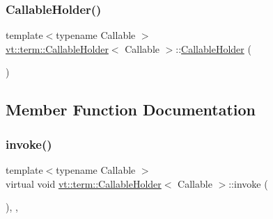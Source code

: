 \mbox{\label{structvt_1_1term_1_1_callable_holder_a02091f8787e03f8e29a9e78a975b86d4}} 
\subsubsection{\texorpdfstring{Callable\+Holder()}{CallableHolder()}\hspace{0.1cm}{\footnotesize\ttfamily [3/3]}}
{\footnotesize\ttfamily template$<$typename Callable $>$ \\
\hyperlink{structvt_1_1term_1_1_callable_holder}{vt\+::term\+::\+Callable\+Holder}$<$ Callable $>$\+::\hyperlink{structvt_1_1term_1_1_callable_holder}{Callable\+Holder} (\begin{DoxyParamCaption}\item[{\hyperlink{structvt_1_1term_1_1_callable_holder}{Callable\+Holder}$<$ Callable $>$ \&\&}]{ }\end{DoxyParamCaption})\hspace{0.3cm}{\ttfamily [default]}}



\subsection{Member Function Documentation}
\mbox{\label{structvt_1_1term_1_1_callable_holder_a33bc8b5d543eb4338c257522cc0084f1}} 
\subsubsection{\texorpdfstring{invoke()}{invoke()}}
{\footnotesize\ttfamily template$<$typename Callable $>$ \\
virtual void \hyperlink{structvt_1_1term_1_1_callable_holder}{vt\+::term\+::\+Callable\+Holder}$<$ Callable $>$\+::invoke (\begin{DoxyParamCaption}{ }\end{DoxyParamCaption})\hspace{0.3cm}{\ttfamily [inline]}, {\ttfamily [override]}, {\ttfamily [virtual]}}



